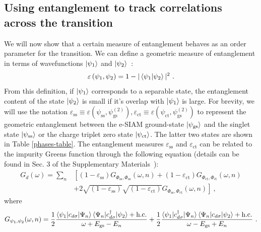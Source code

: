 \documentclass{iopart}
\begin{document}
\subsection{Using entanglement to track correlations across the transition}

We will now show that a certain measure of entanglement behaves as an order parameter for the transition. We can define a geometric measure of entanglement in terms of wavefunctions \(\ket{\psi_1}\) and \(\ket{\psi_2}\)~\cite{shimony1995degree,wei2003geometric,horodecki2009quantum}:
\begin{eqnarray}
	\varepsilon\left(\psi_1,\psi_2\right) = 1 - |\braket{\psi_1 | \psi_2}|^2~.
\end{eqnarray}
From this definition, if \(\ket{\psi_1}\) corresponds to a separable state, the entanglement content of the state \(\ket{\psi_2}\) is small if it's overlap with \(\ket{\psi_1}\) is large.
For brevity, we will use the notation \(\varepsilon_\text{ss} \equiv \varepsilon\left(\psi_\text{ss},\psi^{(2)}_\text{gs}\right), \varepsilon_\text{ct} \equiv \varepsilon\left(\psi_\text{ct},\psi^{(2)}_\text{gs}\right)\) to represent the geometric entanglement between the e-SIAM ground-state \(\ket{\psi_\text{gs}}\) and the singlet state \(\ket{\psi_\text{ss}}\) or the charge triplet zero state \(\ket{\psi_\text{ct}}\).
The latter two states are shown in Table \eqref{phases-table}.
The entanglement measures $\varepsilon_{\text{ss}}$ and $\varepsilon_{\text{ct}}$ can be related to the impurity Greens function through the following equation (details can be found in Sec. 3 of the Supplementary Materials~\cite{supp_mat}):
\begin{eqnarray}
	G_d(\omega) = \sum_n &\left[\left(1 - \varepsilon_\text{ss} \right) G_{\Phi_\text{ss},\Phi_\text{ss}}(\omega,n) + \left(1 - \varepsilon_\text{ct} \right) G_{\Phi_\text{ct},\Phi_\text{ct}}(\omega,n) \right.\nonumber \\
			     &\left.+ 2\sqrt{\left(1 - \varepsilon_\text{ss} \right)}\sqrt{\left(1 - \varepsilon_\text{ct} \right)} G_{\Phi_\text{ss},\Phi_\text{ct}}(\omega,n)\right]~,
	\label{greens-func}
\end{eqnarray}
where
\begin{eqnarray}
	G_{\psi_1,\psi_2}(\omega,n) = \frac{1}{2}\frac{\braket{\psi_1 | c_{d\sigma} | \Psi_n}\braket{\Psi_n | c^\dagger_{d\sigma} | \psi_2} + \text{h.c.}}{\omega + E_\text{gs} - E_n} + \frac{1}{2}\frac{\braket{\psi_1 | c^\dagger_{d\sigma} | \Psi_n}\braket{\Psi_n | c_{d\sigma} | \psi_2} + \text{h.c.}}{\omega - E_\text{gs} + E_n}~.
\end{eqnarray}
\end{document}
